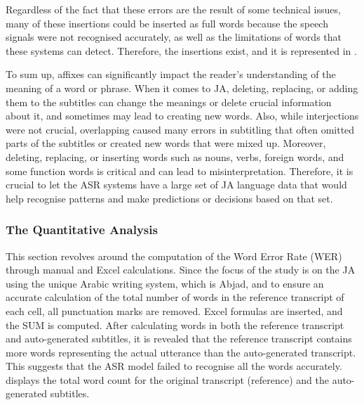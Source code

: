 \documentclass[english]{textolivre}
\begin{document}
Regardless of the fact that these errors are the result of some
technical issues, many of these insertions could be inserted as full
words because the speech signals were not recognised accurately, as well
as the limitations of words that these systems can detect. Therefore,
the insertions exist, and it is represented in .

To sum up, affixes can significantly impact the reader's understanding
of the meaning of a word or phrase. When it comes to JA, deleting,
replacing, or adding them to the subtitles can change the meanings or
delete crucial information about it, and sometimes may lead to creating
new words. Also, while interjections were not crucial, overlapping
caused many errors in subtitling that often omitted parts of the
subtitles or created new words that were mixed up. Moreover, deleting,
replacing, or inserting words such as nouns, verbs, foreign words, and
some function words is critical and can lead to misinterpretation.
Therefore, it is crucial to let the ASR systems have a large set of JA
language data that would help recognise patterns and make predictions or
decisions based on that set.

	
\subsubsection{The Quantitative Analysis}\label{subsec-The-Quantitative-Analysis}
	
This section revolves around the computation of the Word Error Rate
(WER) through manual and Excel calculations. Since the focus of the
study is on the JA using the unique Arabic writing system, which is
Abjad, and to ensure an accurate calculation of the total number of
words in the reference transcript of each cell, all punctuation marks
are removed. Excel formulas are inserted, and the SUM is computed. After
calculating words in both the reference transcript and auto-generated
subtitles, it is revealed that the reference transcript contains more
words representing the actual utterance than the auto-generated
transcript. This suggests that the ASR model failed to recognise all the
words accurately.  displays the total word count for the original
transcript (reference) and the auto-generated subtitles.
\end{document}
